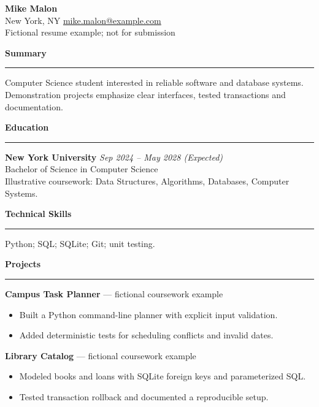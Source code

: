 \documentclass[10pt,letterpaper]{article}
\newenvironment{rSection}[1]{\par\medskip\textbf{\large #1}\par\smallskip\hrule\smallskip}{\par}
\begin{document}
\begin{center}
  {\LARGE\bfseries Mike Malon}\\[4pt]
  New York, NY \quad \href{mailto:mike.malon@example.com}{mike.malon@example.com}\\[3pt]
  {\small Fictional resume example; not for submission}
\end{center}

\begin{rSection}{Summary}
Computer Science student interested in reliable software and database systems.
Demonstration projects emphasize clear interfaces, tested transactions and documentation.
\end{rSection}

\begin{rSection}{Education}
{\bf New York University} \hfill {\em Sep 2024 -- May 2028 (Expected)}\\
Bachelor of Science in Computer Science\\
Illustrative coursework: Data Structures, Algorithms, Databases, Computer Systems.
\end{rSection}

\begin{rSection}{Technical Skills}
Python; SQL; SQLite; Git; unit testing.
\end{rSection}

\begin{rSection}{Projects}
\textbf{Campus Task Planner} --- fictional coursework example
\begin{itemize}
  \item Built a Python command-line planner with explicit input validation.
  \item Added deterministic tests for scheduling conflicts and invalid dates.
\end{itemize}
\textbf{Library Catalog} --- fictional coursework example
\begin{itemize}
  \item Modeled books and loans with SQLite foreign keys and parameterized SQL.
  \item Tested transaction rollback and documented a reproducible setup.
\end{itemize}
\end{rSection}
\end{document}
